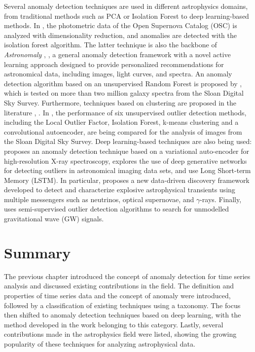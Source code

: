 Several anomaly detection techniques are used in different astrophysics domains, from traditional methods such as PCA or Isolation Forest to deep learning-based methods. In \cite{Pruzhinskaya_2019}, the photometric data of the Open Supernova Catalog (OSC) is analyzed with dimensionality reduction, and anomalies are detected with the isolation forest algorithm. The latter technique is also the backbone of \textit{Astronomaly} \cite{Webb_2020}, \cite{Lochner_2021}, a general anomaly detection framework with a novel active learning approach designed to provide personalized recommendations for astronomical data, including images, light curves, and spectra. An anomaly detection algorithm based on an unsupervised Random Forest is proposed by \cite{Baron_2017}, which is tested on more than two million galaxy spectra from the Sloan Digital Sky Survey. Furthermore, techniques based on clustering are proposed in the literature \cite{Sadr_2019}, \cite{Giles_2019}. In \cite{Doorenbos_2021}, the performance of six unsupervised outlier detection methods, including the Local Outlier Factor, Isolation Forest, k-means clustering and a convolutional autoencoder, are being compared for the analysis of images from the Sloan Digital Sky Survey. Deep learning-based techniques are also being used: \cite{Ichinohe_2019} proposes an anomaly detection technique based on a variational auto-encoder for high-resolution X-ray spectroscopy, \cite{Margalef_2020} explores the use of deep generative networks for detecting outliers in astronomical imaging data sets, \cite{Zhang_2018} and \cite{Sadeh_2020} use Long Short-term Memory (LSTM). In particular, \cite{Sadeh_2020} proposes a new data-driven discovery framework developed to detect and characterize explosive astrophysical transients using multiple messengers such as neutrinos, optical supernovae, and $\gamma$-rays. Finally, \cite{Marianer_2021} uses semi-supervised outlier detection algorithms to search for unmodelled gravitational wave (GW) signals.


\section{Summary}
The previous chapter introduced the concept of anomaly detection for time series analysis and discussed existing contributions in the field. The definition and properties of time series data and the concept of anomaly were introduced, followed by a classification of existing techniques using a taxonomy. The focus then shifted to anomaly detection techniques based on deep learning, with the method developed in the work belonging to this category. Lastly, several contributions made in the astrophysics field were listed, showing the growing popularity of these techniques for analyzing astrophysical data.